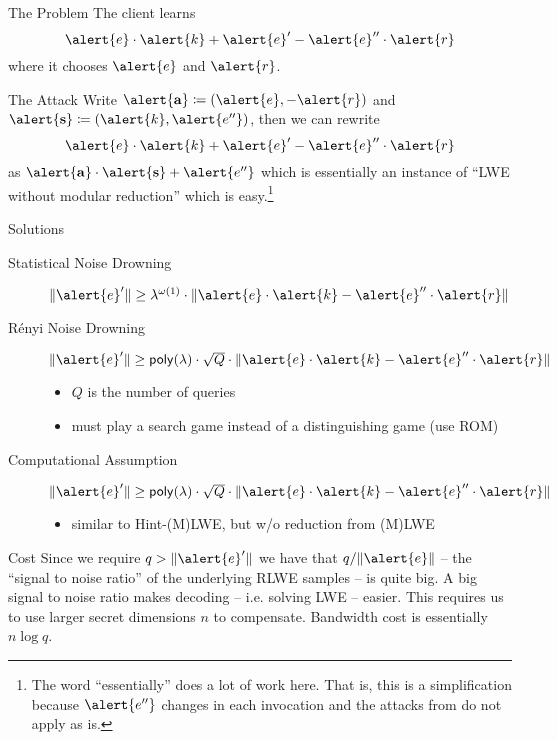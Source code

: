 \documentclass[xcolor=table,10pt,aspectratio=169]{beamer}
\renewcommand{\vec}[1]{\ensuremath{\mathbf{#1}}\xspace}
\begin{document}
\begin{frame}[label={sec:org4babeb2}]{The Problem}
The client learns
\[\alert{e}\cdot\alert{k} + \alert{e}'  - \alert{e}'' \cdot \alert{r}\]
where it chooses \(\alert{e}\) and \(\alert{r}\). 
\begin{block}{The Attack}
Write \(\alert{\vec{a}} \coloneqq (\alert{e}, -\alert{r})\) and \(\alert{\vec{s}} \coloneqq (\alert{k}, \alert{e''})\), then we can rewrite \[\alert{e}\cdot\alert{k} + \alert{e}'  - \alert{e}'' \cdot \alert{r}\]
as \(\alert{\vec{a}} \cdot \alert{\vec{s}} + \alert{e''}\) which is essentially an instance of ``LWE without modular reduction'' \cite{AC:BDEFT18} which is easy.\footnote{The word ``essentially'' does a lot of work here. That is, this is a simplification because \(\alert{e''}\) changes in each invocation and the attacks from \cite{AC:BDEFT18} do not apply as is.}
\end{block}
\end{frame}
\begin{frame}[label={sec:orgd0a5414}]{Solutions}
\begin{description}
\item[{Statistical Noise Drowning}] \(\Vert\alert{e}'\Vert \geq \lambda^{\omega(1)} \cdot \Vert\alert{e}\cdot\alert{k}  - \alert{e}'' \cdot \alert{r}\Vert\) \cite{PKC:ADDS21}
\item[{Rényi Noise Drowning}] \(\Vert\alert{e}'\Vert \geq \poly \cdot \sqrt{Q} \cdot \Vert\alert{e}\cdot\alert{k}  - \alert{e}'' \cdot \alert{r}\Vert\) \cite{AC:AlbGur24}
\begin{itemize}
\item \(Q\) is the number of queries
\item must play a search game instead of a distinguishing game (use ROM)
\end{itemize}
\item[{Computational Assumption}] \(\Vert\alert{e}'\Vert \geq \poly \cdot \sqrt{Q} \cdot \Vert\alert{e}\cdot\alert{k}  - \alert{e}'' \cdot \alert{r}\Vert\) \cite{EPRINT:ESTX24}
\begin{itemize}
\item similar to Hint-(M)LWE, but w/o reduction from (M)LWE
\end{itemize}
\end{description}
\begin{block}{Cost}
Since we require \(q > \Vert\alert{e}'\Vert\) we have that \(q/\Vert \alert{e} \Vert\) -- the ``signal to noise ratio'' of the underlying RLWE samples -- is quite big.  A big signal to noise ratio makes decoding -- i.e. solving LWE -- easier. This requires us to use larger secret dimensions \(n\) to compensate. Bandwidth cost is essentially \(n \log q\).
\end{block}
\end{frame}
\end{document}
